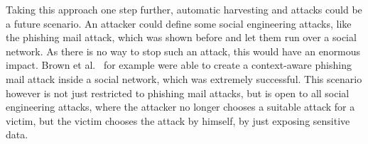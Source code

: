 Taking this approach one step further, automatic harvesting and attacks could
be a future scenario. An attacker could define some social engineering attacks,
like the phishing mail attack, which was shown before and let them run over a
social network. As there is no way to stop such an attack, this would have an
enormous impact. Brown et al.~\cite{brown2008} for example were able to create
a context-aware phishing mail attack inside a social network, which was
extremely successful. This scenario however is not just restricted to phishing
mail attacks, but is open to all social engineering attacks, where the attacker
no longer chooses a suitable attack for a victim, but the victim chooses the
attack by himself, by just exposing sensitive data.
